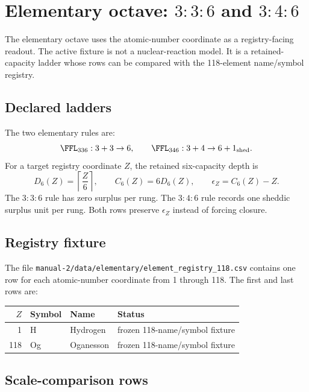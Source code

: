 \section{Elementary octave: $3{:}3{:}6$ and $3{:}4{:}6$}

The elementary octave uses the atomic-number coordinate as a registry-facing readout. The active fixture is not a nuclear-reaction model. It is a retained-capacity ladder whose rows can be compared with the 118-element name/symbol registry.

\subsection{Declared ladders}

The two elementary rules are:
\[
\FFL_{336}: 3+3\to 6,
\qquad
\FFL_{346}: 3+4\to 6+1_{\mathrm{shed}}.
\]
For a target registry coordinate $Z$, the retained six-capacity depth is
\[
D_6(Z)=\left\lceil \frac{Z}{6}\right\rceil,
\qquad
C_6(Z)=6D_6(Z),
\qquad
\epsilon_Z=C_6(Z)-Z.
\]
The $3{:}3{:}6$ rule has zero surplus per rung. The $3{:}4{:}6$ rule records one sheddic surplus unit per rung. Both rows preserve $\epsilon_Z$ instead of forcing closure.

\subsection{Registry fixture}

The file \texttt{manual-2/data/elementary/element\_registry\_118.csv} contains one row for each atomic-number coordinate from 1 through 118. The first and last rows are:
\begin{center}
\begin{tabular}{@{}rlll@{}}
\toprule
$Z$ & Symbol & Name & Status \\
\midrule
1 & H & Hydrogen & frozen 118-name/symbol fixture \\
118 & Og & Oganesson & frozen 118-name/symbol fixture \\
\bottomrule
\end{tabular}
\end{center}


\subsection{Scale-comparison rows}

